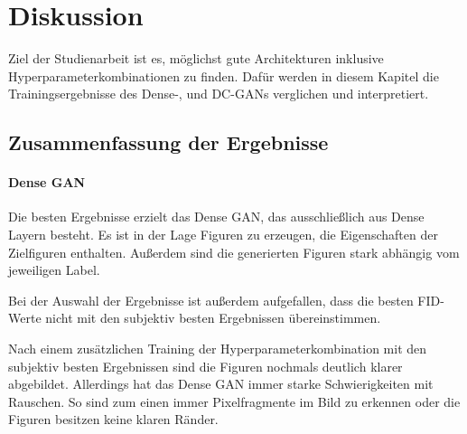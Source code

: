 
\chapter{Diskussion}
Ziel der Studienarbeit ist es, möglichst gute Architekturen inklusive Hyperparameterkombinationen zu finden.
Dafür werden in diesem Kapitel die Trainingsergebnisse des Dense-, und DC-GANs verglichen und interpretiert.

\section{Zusammenfassung der Ergebnisse}
\subsubsection{Dense GAN}
Die besten Ergebnisse erzielt das Dense GAN, das ausschließlich aus Dense Layern besteht.
Es ist in der Lage Figuren zu erzeugen, die Eigenschaften der Zielfiguren enthalten.
Außerdem sind die generierten Figuren stark abhängig vom jeweiligen Label.

Bei der Auswahl der Ergebnisse ist außerdem aufgefallen, dass die besten FID-Werte nicht mit den subjektiv besten Ergebnissen übereinstimmen.
\newline

Nach einem zusätzlichen Training der Hyperparameterkombination mit den subjektiv besten Ergebnissen sind die Figuren nochmals deutlich klarer abgebildet.
Allerdings hat das Dense GAN immer starke Schwierigkeiten mit Rauschen.
So sind zum einen immer Pixelfragmente im Bild zu erkennen oder die Figuren besitzen keine klaren Ränder.

